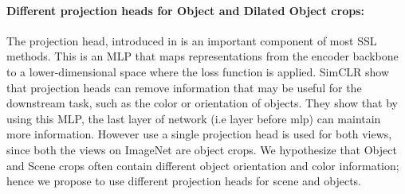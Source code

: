\paragraph{Different projection heads for Object and Dilated Object crops:}
The projection head, introduced in \cite{chen2020simple} is an important component of most SSL methods. This is an MLP that maps representations from the encoder backbone to a lower-dimensional space where the loss function is applied. 
SimCLR \cite{chen2020simple} show that projection heads can remove information that may be useful for the downstream task, such as the color or orientation of objects. They show that by using this MLP, the last layer of network (i.e layer before mlp) can maintain more information. However \cite{chen2020exploring} use a single projection head is used for both views, since both the views on ImageNet are object crops.  We hypothesize that Object and Scene crops often contain different object orientation and color information; hence we propose to use different projection heads for scene and objects.





